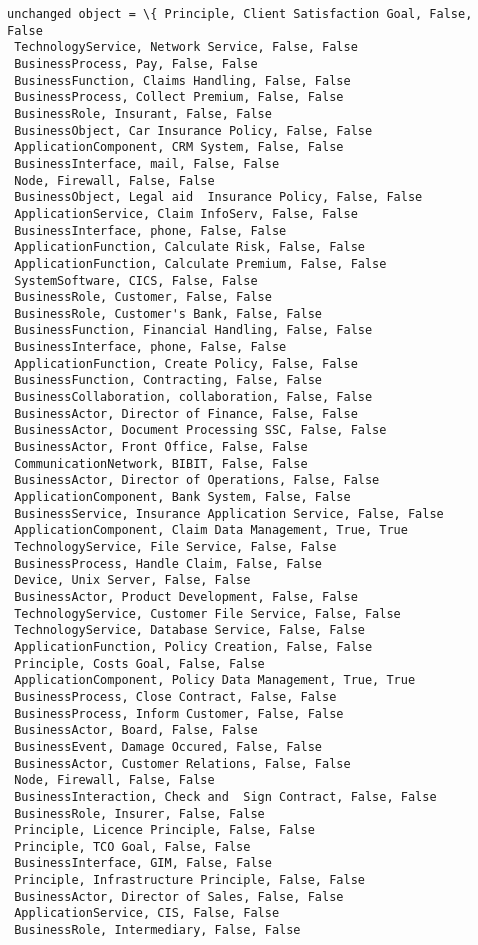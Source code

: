 \documentclass[11pt]{article}
\begin{document}
\begin{Verbatim}[commandchars=\\\{\}]
unchanged object = \{ Principle, Client Satisfaction Goal, False, False 
 TechnologyService, Network Service, False, False 
 BusinessProcess, Pay, False, False 
 BusinessFunction, Claims Handling, False, False 
 BusinessProcess, Collect Premium, False, False 
 BusinessRole, Insurant, False, False 
 BusinessObject, Car Insurance Policy, False, False 
 ApplicationComponent, CRM System, False, False 
 BusinessInterface, mail, False, False 
 Node, Firewall, False, False 
 BusinessObject, Legal aid  Insurance Policy, False, False 
 ApplicationService, Claim InfoServ, False, False 
 BusinessInterface, phone, False, False 
 ApplicationFunction, Calculate Risk, False, False 
 ApplicationFunction, Calculate Premium, False, False 
 SystemSoftware, CICS, False, False 
 BusinessRole, Customer, False, False 
 BusinessRole, Customer's Bank, False, False 
 BusinessFunction, Financial Handling, False, False 
 BusinessInterface, phone, False, False 
 ApplicationFunction, Create Policy, False, False 
 BusinessFunction, Contracting, False, False 
 BusinessCollaboration, collaboration, False, False 
 BusinessActor, Director of Finance, False, False 
 BusinessActor, Document Processing SSC, False, False 
 BusinessActor, Front Office, False, False 
 CommunicationNetwork, BIBIT, False, False 
 BusinessActor, Director of Operations, False, False 
 ApplicationComponent, Bank System, False, False 
 BusinessService, Insurance Application Service, False, False 
 ApplicationComponent, Claim Data Management, True, True 
 TechnologyService, File Service, False, False 
 BusinessProcess, Handle Claim, False, False 
 Device, Unix Server, False, False 
 BusinessActor, Product Development, False, False 
 TechnologyService, Customer File Service, False, False 
 TechnologyService, Database Service, False, False 
 ApplicationFunction, Policy Creation, False, False 
 Principle, Costs Goal, False, False 
 ApplicationComponent, Policy Data Management, True, True 
 BusinessProcess, Close Contract, False, False 
 BusinessProcess, Inform Customer, False, False 
 BusinessActor, Board, False, False 
 BusinessEvent, Damage Occured, False, False 
 BusinessActor, Customer Relations, False, False 
 Node, Firewall, False, False 
 BusinessInteraction, Check and  Sign Contract, False, False 
 BusinessRole, Insurer, False, False 
 Principle, Licence Principle, False, False 
 Principle, TCO Goal, False, False 
 BusinessInterface, GIM, False, False 
 Principle, Infrastructure Principle, False, False 
 BusinessActor, Director of Sales, False, False 
 ApplicationService, CIS, False, False 
 BusinessRole, Intermediary, False, False 

\end{Verbatim}
\end{document}
